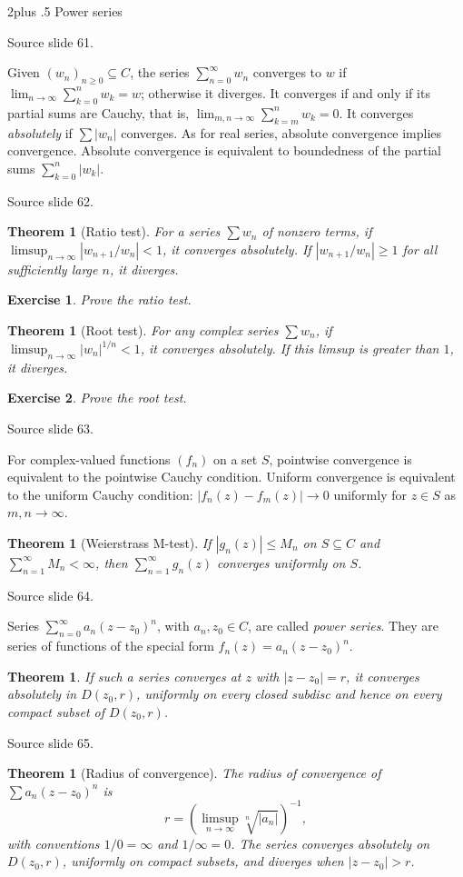 \documentclass[10pt,letterpaper,twoside,openright]{amsbook}
\makeatletter
\numberwithin{equation}{subsection}
\renewcommand{\section}{\@startsection{section}{1}
 {\z@}{2\baselineskip plus .5\baselineskip}
 {\baselineskip}{\normalfont\Large\bfseries\centering}}
\theoremstyle{sea-plain}
\newtheorem{theorem}[subsection]{Theorem}
\theoremstyle{sea-definition}
\theoremstyle{sea-exercise}
\newtheorem{exercise}{Exercise}[section]
\newcommand{\RR}{\mathbb{R}}
\newcommand{\CC}{\mathbb{C}}
\newcommand{\DD}{\mathbb{D}}
\newcommand{\HH}{\mathbb{H}}
\newcommand{\Chat}{\mathbb{C}_{\infty}}
\def\CC{C}\def\RR{R}\def\DD{D}\def\HH{H}\def\Chat{C infinity}}
\newcommand{\src}[1]{\par\smallskip\noindent
 {\scriptsize\sffamily\color{SoftWhite}Source slide #1.}\par\nopagebreak\smallskip}
\makeatother
\begin{document}
\section{Power series}
\src{61}
Given $(w_n)_{n\geq0}\subseteq\CC$, the series $\sum_{n=0}^\infty w_n$
converges to $w$ if $\lim_{n\to\infty}\sum_{k=0}^nw_k=w$; otherwise it
diverges. It converges if and only if its partial sums are Cauchy, that is,
$\lim_{m,n\to\infty}\sum_{k=m}^nw_k=0$.
It converges \emph{absolutely} if $\sum|w_n|$ converges.
As for real series, absolute convergence implies convergence.
Absolute convergence is equivalent to boundedness of the partial sums
$\sum_{k=0}^n|w_k|$.
\src{62}
\begin{theorem}[Ratio test]
For a series $\sum w_n$ of nonzero terms, if
$\limsup_{n\to\infty}|w_{n+1}/w_n|<1$, it converges absolutely.
If $|w_{n+1}/w_n|\geq1$ for all sufficiently large $n$, it diverges.
\end{theorem}
\begin{exercise}Prove the ratio test.\end{exercise}
\begin{theorem}[Root test]
For any complex series $\sum w_n$, if
$\limsup_{n\to\infty}|w_n|^{1/n}<1$, it converges absolutely.
If this limsup is greater than $1$, it diverges.
\end{theorem}
\begin{exercise}Prove the root test.\end{exercise}
\src{63}
For complex-valued functions $(f_n)$ on a set $S$, pointwise convergence
is equivalent to the pointwise Cauchy condition. Uniform convergence is
equivalent to the uniform Cauchy condition:
$|f_n(z)-f_m(z)|\to0$ uniformly for $z\in S$ as $m,n\to\infty$.
\begin{theorem}[Weierstrass M-test]
If $|g_n(z)|\leq M_n$ on $S\subseteq\CC$ and
$\sum_{n=1}^\infty M_n<\infty$, then $\sum_{n=1}^\infty g_n(z)$
converges uniformly on $S$.
\end{theorem}
\src{64}
Series $\sum_{n=0}^\infty a_n(z-z_0)^n$, with $a_n,z_0\in\CC$, are
called \emph{power series}. They are series of functions of the special
form $f_n(z)=a_n(z-z_0)^n$.
\begin{theorem}
If such a series converges at $z$ with $|z-z_0|=r$, it converges absolutely
in $D(z_0,r)$, uniformly on every closed subdisc and hence on every compact
subset of $D(z_0,r)$.
\end{theorem}
\src{65}
\begin{theorem}[Radius of convergence]
The radius of convergence of $\sum a_n(z-z_0)^n$ is
\[
 r=\left(\limsup_{n\to\infty}\sqrt[n]{|a_n|}\right)^{-1},
\]
with conventions $1/0=\infty$ and $1/\infty=0$. The series converges
absolutely on $D(z_0,r)$, uniformly on compact subsets, and diverges
when $|z-z_0|>r$.
\end{theorem}
\end{document}
